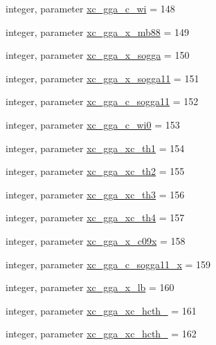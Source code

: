 \begin{DoxyCompactItemize}
\item 
integer, parameter \hyperlink{classlibxc__funcs__m_a8ab7ca0cca8496184215d48b634ce622}{xc\-\_\-gga\-\_\-c\-\_\-wi} = 148
\item 
integer, parameter \hyperlink{classlibxc__funcs__m_a985d276a84d40ee5a66c05803de01b7f}{xc\-\_\-gga\-\_\-x\-\_\-mb88} = 149
\item 
integer, parameter \hyperlink{classlibxc__funcs__m_a4b3a8132241bff9357d3dc2cea3a9e44}{xc\-\_\-gga\-\_\-x\-\_\-sogga} = 150
\item 
integer, parameter \hyperlink{classlibxc__funcs__m_af12ae836ad3229d0f6059119d7d8b059}{xc\-\_\-gga\-\_\-x\-\_\-sogga11} = 151
\item 
integer, parameter \hyperlink{classlibxc__funcs__m_a3bd4db90757fc2c20940b19d3680eee6}{xc\-\_\-gga\-\_\-c\-\_\-sogga11} = 152
\item 
integer, parameter \hyperlink{classlibxc__funcs__m_a632d1bb9c80ebf7dbd1a528ac99f468b}{xc\-\_\-gga\-\_\-c\-\_\-wi0} = 153
\item 
integer, parameter \hyperlink{classlibxc__funcs__m_a8ade33baed98a4fedb4c7173f0800880}{xc\-\_\-gga\-\_\-xc\-\_\-th1} = 154
\item 
integer, parameter \hyperlink{classlibxc__funcs__m_ac05ac07329e2851d83140e2330a7f585}{xc\-\_\-gga\-\_\-xc\-\_\-th2} = 155
\item 
integer, parameter \hyperlink{classlibxc__funcs__m_a835033b0e6fec4e50ef7a750e331c69f}{xc\-\_\-gga\-\_\-xc\-\_\-th3} = 156
\item 
integer, parameter \hyperlink{classlibxc__funcs__m_ade88b73ee789f7e6c43efadfad499cfb}{xc\-\_\-gga\-\_\-xc\-\_\-th4} = 157
\item 
integer, parameter \hyperlink{classlibxc__funcs__m_a90045ccf4e4bc31c967fb33c660812f1}{xc\-\_\-gga\-\_\-x\-\_\-c09x} = 158
\item 
integer, parameter \hyperlink{classlibxc__funcs__m_a687295f1b9ae8536d2409f76d20cb8e9}{xc\-\_\-gga\-\_\-c\-\_\-sogga11\-\_\-x} = 159
\item 
integer, parameter \hyperlink{classlibxc__funcs__m_af1dc005dd5c98bdc37262ba725ce2130}{xc\-\_\-gga\-\_\-x\-\_\-lb} = 160
\item 
integer, parameter \hyperlink{classlibxc__funcs__m_a3c4b26010b643e50f95d45551e71494d}{xc\-\_\-gga\-\_\-xc\-\_\-hcth\-\_} = 161
\item 
integer, parameter \hyperlink{classlibxc__funcs__m_ab36e6061f88fb2c6b82d698c729dfbc0}{xc\-\_\-gga\-\_\-xc\-\_\-hcth\-\_} = 162
\item 

\end{DoxyCompactItemize}
